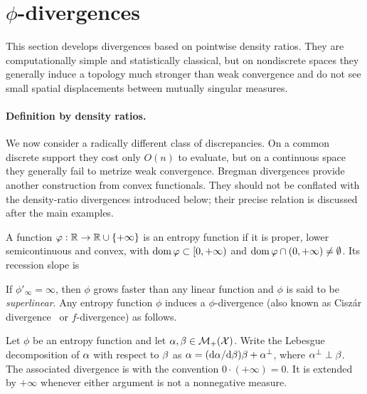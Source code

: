\section[phi-divergences]{$\phi$-divergences}
\label{sec-phi-div}


This section develops divergences based on pointwise density ratios. They are computationally simple and statistically classical, but on nondiscrete spaces they generally induce a topology much stronger than weak convergence and do not see small spatial displacements between mutually singular measures.

\paragraph{Definition by density ratios.}

We now consider a radically different class of discrepancies. On a common discrete support they cost only $O(n)$ to evaluate, but on a continuous space they generally fail to metrize weak convergence.
%
Bregman divergences provide another construction from convex functionals. They should not be conflated with the density-ratio divergences introduced below; their precise relation is discussed after the main examples.

\begin{defn}
\label{def_entropy}
A function $\varphi : \mathbb{R} \to \mathbb{R} \cup \{+\infty\}$ is an entropy function if it is proper, lower semicontinuous and convex, with $\operatorname{dom} \varphi\subset [0,+\infty)$ and $\operatorname{dom} \varphi \cap (0,+\infty) \neq \emptyset$. Its recession slope is
\end{defn}

If $\phi'_\infty = \infty$, then $\phi$ grows faster than any linear function and $\phi$ is said to be \emph{superlinear}. Any entropy function $\phi$ induces a $\phi$-divergence (also known as Cisz\'ar divergence~\cite{ciszar1967information,ali1966general} or $f$-divergence) as follows.

\begin{defn}
\label{def_divergence}
Let $\phi$ be an entropy function and let $\alpha,\beta\in\mathcal{M}_+(\mathcal{X})$. Write the Lebesgue decomposition of $\alpha$ with respect to $\beta$ as
$\alpha=(\mathrm{d}\alpha/\mathrm{d}\beta)\beta+\alpha^\perp$, where $\alpha^\perp\perp\beta$. The associated divergence is
with the convention $0\cdot(+\infty)=0$. It is extended by $+\infty$ whenever either argument is not a nonnegative measure.
\end{defn}%

